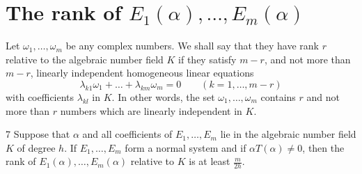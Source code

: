 \section{The rank of $E_1(\alpha), \dots, E_m(\alpha)$}

Let $\omega_1, \dots, \omega_m$ be any complex numbers. We shall say that they have rank $r$ relative to the algebraic number field $K$ if they satisfy $m-r$, and not more than $m-r$, linearly independent homogeneous linear equations
\[\lambda_{k1} \omega_1 + \dots + \lambda_{km} \omega_m = 0 \qquad (k=1,\dots,m-r)\]
with coefficients $\lambda_{kl}$ in $K$. In other words, the set $\omega_1, \dots, \omega_m$ contains $r$ and not more than $r$ numbers which are linearly independent in $K$.

\begin{mylemma}{}{7}
Suppose that $\alpha$ and all coefficients of $E_1, \dots, E_m$ lie in the algebraic number field $K$ of degree $h$. If $E_1, \dots, E_m$ form a normal system and if $\alpha T(\alpha) \neq 0$, then the rank of $E_1(\alpha), \dots, E_m(\alpha)$ relative to $K$ is at least $\frac{m}{2h}$.
\end{mylemma}

